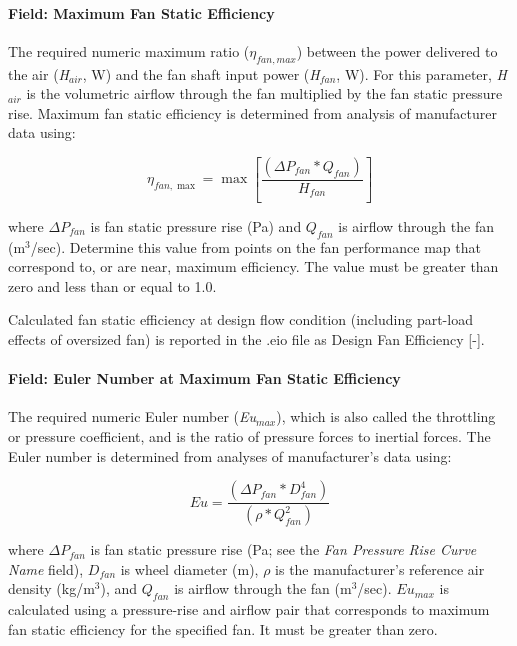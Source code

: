 \paragraph{Field: Maximum Fan Static Efficiency}\label{field-maximum-fan-static-efficiency}

The required numeric maximum ratio (\(\eta_{fan,max}\)) between the power delivered to the air (\emph{H\(_{air}\)}, W) and the fan shaft input power (\emph{H\(_{fan}\)}, W). For this parameter, \emph{H\(_{air}\)} is the volumetric airflow through the fan multiplied by the fan static pressure rise. Maximum fan static efficiency is determined from analysis of manufacturer data using:

\begin{equation}
{\eta_{fan,\max }} = \max \left[ {\frac{{\left( {\Delta {P_{fan}} * {Q_{fan}}} \right)}}{{{H_{fan}}}}} \right]
\end{equation}

where \(\Delta P_{fan}\) is fan static pressure rise (Pa) and \(Q_{fan}\) is airflow through the fan (m\(^{3}\)/sec). Determine this value from points on the fan performance map that correspond to, or are near, maximum efficiency. The value must be greater than zero and less than or equal to 1.0.

Calculated fan static efficiency at design flow condition (including part-load effects of oversized fan) is reported in the .eio file as Design Fan Efficiency {[}-{]}.

\paragraph{Field: Euler Number at Maximum Fan Static Efficiency}\label{field-euler-number-at-maximum-fan-static-efficiency}

The required numeric Euler number (\emph{Eu\(_{max}\)}), which is also called the throttling or pressure coefficient, and is the ratio of pressure forces to inertial forces. The Euler number is determined from analyses of manufacturer's data using:

\begin{equation}
Eu = \frac{{\left( {\Delta {P_{fan}} * D_{fan}^4} \right)}}{{\left( {\rho  * Q_{fan}^2} \right)}}
\end{equation}

where \(\Delta P_{fan}\) is fan static pressure rise (Pa; see the \emph{Fan Pressure Rise Curve Name} field), \(D_{fan}\) is wheel diameter (m), \(\rho\) is the manufacturer's reference air density (kg/m\(^{3}\)), and \(Q_{fan}\) is airflow through the fan (m\(^{3}\)/sec). \(Eu_{max}\) is calculated using a pressure-rise and airflow pair that corresponds to maximum fan static efficiency for the specified fan. It must be greater than zero.


